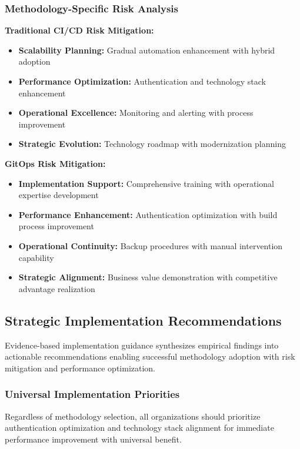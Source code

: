 \subsubsection{Methodology-Specific Risk Analysis}


\textbf{Traditional CI/CD Risk Mitigation:}
\begin{itemize}
\item \textbf{Scalability Planning:} Gradual automation enhancement with hybrid adoption
\item \textbf{Performance Optimization:} Authentication and technology stack enhancement
\item \textbf{Operational Excellence:} Monitoring and alerting with process improvement
\item \textbf{Strategic Evolution:} Technology roadmap with modernization planning
\end{itemize}

\textbf{GitOps Risk Mitigation:}
\begin{itemize}
\item \textbf{Implementation Support:} Comprehensive training with operational expertise development
\item \textbf{Performance Enhancement:} Authentication optimization with build process improvement
\item \textbf{Operational Continuity:} Backup procedures with manual intervention capability
\item \textbf{Strategic Alignment:} Business value demonstration with competitive advantage realization
\end{itemize}

\subsection{Strategic Implementation Recommendations}
\label{subsec:implementation_recommendations}

Evidence-based implementation guidance synthesizes empirical findings into actionable recommendations enabling successful methodology adoption with risk mitigation and performance optimization.

\subsubsection{Universal Implementation Priorities}

Regardless of methodology selection, all organizations should prioritize authentication optimization and technology stack alignment for immediate performance improvement with universal benefit.

